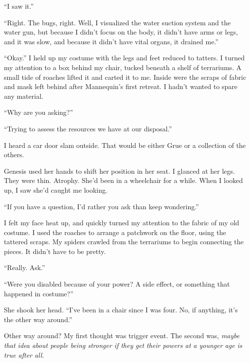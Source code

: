 ``I saw it.''



``Right.  The bugs, right.  Well, I visualized the water suction system and the water gun, but because I didn't focus on the body, it didn't have arms or legs, and it was slow, and because it didn't have vital organs, it drained me.''



``Okay.''  I held up my costume with the legs and feet reduced to tatters.  I turned my attention to a box behind my chair, tucked beneath a shelf of terrariums.  A small tide of roaches lifted it and carted it to me.  Inside were the scraps of fabric and mask left behind after Mannequin's first retreat.  I hadn't wanted to spare any material.



``Why are you asking?''



``Trying to assess the resources we have at our disposal.''



I heard a car door slam outside.  That would be either Grue or a collection of the others.



Genesis used her hands to shift her position in her seat.  I glanced at her legs.  They were thin.  Atrophy.  She'd been in a wheelchair for a while.  When I looked up, I saw she'd caught me looking.



``If you have a question, I'd rather you ask than keep wondering.''



I felt my face heat up, and quickly turned my attention to the fabric of my old costume.  I used the roaches to arrange a patchwork on the floor, using the tattered scraps.  My spiders crawled from the terrariums to begin connecting the pieces.  It didn't have to be pretty.



``Really.  Ask.''



``Were you disabled because of your power?  A side effect, or something that happened in costume?''



She shook her head.  ``I've been in a chair since I was four.  No, if anything, it's the other way around.''



Other way around?  My first thought was trigger event.  The second was, \emph{maybe that idea about people being stronger if they get their powers at a younger age is true after all}.



